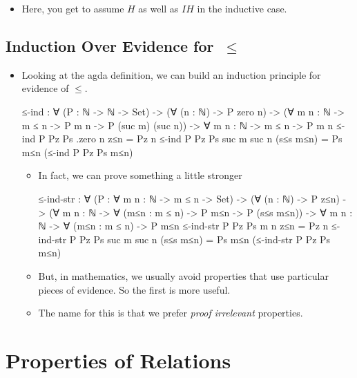 \documentclass{lecturenotes}
\begin{document}
\begin{itemize}
\begin{proof}
    \noindent\textbf{Base case (\textsf{z≤n}):} \dots

    \noindent\textbf{Inductive case (\textsf{s≤s}):}
    $$H = m \le n$$
    $$IH = P(m, n)$$
    $$\text{To prove: } P(\textsf{suc}(m), \textsf{suc}(n))$$
    \dots
  \end{proof}
\item Here, you get to assume $H$ as well as $IH$ in the inductive case.
\end{itemize}

\subsection{Induction Over Evidence for~$\le$}
\label{sec:induct-over-evid}

\begin{itemize}
\item Looking at the agda definition, we can build an induction principle for evidence of $\leq$.
\begin{code}
≤-ind : ∀ (P : ℕ -> ℕ -> Set) ->
  (∀ (n : ℕ) -> P zero n) ->
  (∀ {m n : ℕ} -> m ≤ n -> P m n -> P (suc m) (suc n)) ->
  ∀ {m n : ℕ} -> m ≤ n -> P m n
≤-ind P Pz Ps .{zero} {n} z≤n = Pz n
≤-ind P Pz Ps {suc m} {suc n} (s≤s m≤n) = Ps m≤n (≤-ind P Pz Ps m≤n)
\end{code}
\begin{itemize}
\item In fact, we can prove something a little stronger
\begin{code}
≤-ind-str : ∀ (P : ∀ {m n : ℕ} -> m ≤ n -> Set) ->
  (∀ (n : ℕ) -> P z≤n) ->
  (∀ {m n : ℕ} -> ∀ (m≤n : m ≤ n) -> P m≤n -> P (s≤s m≤n)) ->
  ∀ {m n : ℕ} -> ∀ (m≤n : m ≤ n) -> P m≤n
≤-ind-str P Pz Ps {m} {n} z≤n = Pz n
≤-ind-str P Pz Ps {suc m} {suc n} (s≤s m≤n) = Ps m≤n (≤-ind-str P Pz Ps m≤n)
\end{code}
\item But, in mathematics, we usually avoid properties that use particular pieces of evidence.
  So the first is more useful.
\item The name for this is that we prefer \emph{proof irrelevant} properties.
\end{itemize}
\end{itemize}

\section{Properties of Relations}
\label{sec:properties-relations}
\end{document}
